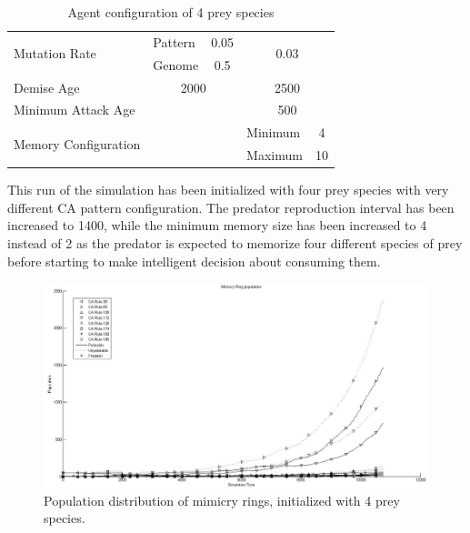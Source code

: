 \begin{table}[H]
\begin{tabular}{|l|l|c|c|l|c|}
  \multirow{2}{*}{Mutation Rate} & Pattern   & \multicolumn{2}{|c|}{0.05} & \multicolumn{2}{|c|}{\multirow{2}{*}{0.03}} \\ \cline{2-4}
  						 									 & Genome    & \multicolumn{2}{|c|}{0.5}  & \multicolumn{2}{|c|}{} \\ \hline
  Demise Age	 									 & \multicolumn{3}{|c|}{2000}							& \multicolumn{2}{|c|}{2500} \\ \hline
  Minimum Attack Age						 & \multicolumn{3}{|c|}{} 						    & \multicolumn{2}{|c|}{500} \\ \hline
  \multirow{2}{*}{Memory Configuration} & \multicolumn{3}{|c|}{} 					& Minimum & 4 \\ \cline{5-6}
   																			& \multicolumn{3}{|c|}{} 					& Maximum & 10 \\ \hline  
\end{tabular}
\caption{Agent configuration of 4 prey species}
\label{tab:config-table-4-prey}
\end{table}

This run of the simulation has been initialized with four prey species with very different CA pattern configuration. The predator reproduction interval has been increased to 1400, while the minimum memory size has been increased to 4 instead of 2 as the predator is expected to memorize four different species of prey before starting to make intelligent decision about consuming them. 

\begin{figure}[H]
	\centering
	\includegraphics[scale=0.40]{images/simTime10k-4Prey}
	\caption{Population distribution of mimicry rings, initialized with 4 prey species.}
	\label{fig:plot-4-prey}
\end{figure}

